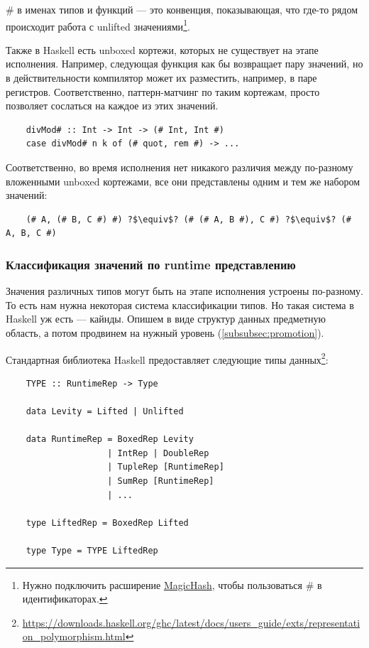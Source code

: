 \# в именах типов и функций --- это конвенция, показывающая, что где-то рядом происходит работа с unlifted значениями\footnote{Нужно подключить расширение \href{https://ghc.gitlab.haskell.org/ghc/doc/users_guide/exts/magic_hash.html}{MagicHash}, чтобы пользоваться \# в идентификаторах.}.

Также в Haskell есть unboxed кортежи, которых не существует на этапе исполнения.
Например, следующая функция как бы возвращает пару значений, но в действительности компилятор может их разместить, например, в паре регистров.
Соответственно, паттерн-матчинг по таким кортежам, просто позволяет сослаться на каждое из этих значений.
\begin{verbatim}
    divMod# :: Int -> Int -> (# Int, Int #)
    case divMod# n k of (# quot, rem #) -> ...
\end{verbatim}
Соответственно, во время исполнения нет никакого различия между по-разному вложенными unboxed кортежами, все они представлены одним и тем же набором значений:
\begin{verbatim}
    (# A, (# B, C #) #) ?$\equiv$? (# (# A, B #), C #) ?$\equiv$? (# A, B, C #)
\end{verbatim}

\subsubsection{Классификация значений по runtime представлению}

Значения различных типов могут быть на этапе исполнения устроены по-разному.
То есть нам нужна некоторая система классификации типов.
Но такая система в Haskell уж есть --- кайнды.
Опишем в виде структур данных предметную область, а потом продвинем на нужный уровень (\ref{subsubsec:promotion}).

Стандартная библиотека Haskell предоставляет следующие типы данных\footnote{\url{https://downloads.haskell.org/ghc/latest/docs/users_guide/exts/representation_polymorphism.html}}:
\begin{verbatim}
    TYPE :: RuntimeRep -> Type

    data Levity = Lifted | Unlifted

    data RuntimeRep = BoxedRep Levity
                    | IntRep | DoubleRep
                    | TupleRep [RuntimeRep]
                    | SumRep [RuntimeRep]
                    | ...

    type LiftedRep = BoxedRep Lifted

    type Type = TYPE LiftedRep
\end{verbatim}

